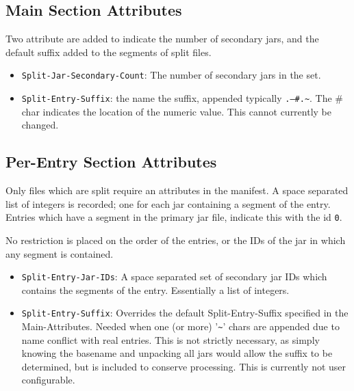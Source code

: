 \documentclass[a4paper, 12pt, pdftex]{report}
\begin{document}
\subsection{Main Section Attributes}

Two attribute are added to indicate the number of secondary jars, and
the default suffix added to the segments of split files.

\begin{itemize}
  \item \texttt{Split-Jar-Secondary-Count}: The number of secondary jars
        in the set.
  \item \texttt{Split-Entry-Suffix}: the name the suffix, appended typically
        \texttt{.---\#.\~{}}. The \# char indicates the location of the numeric value.
        This cannot currently be changed.
\end{itemize}

\subsection{Per-Entry Section Attributes}

Only files which are split require an attributes in the manifest. A
space separated list of integers is recorded; one for each jar
containing a segment of the entry. Entries which have a segment in the
primary jar file, indicate this with the id \texttt{0}.

No restriction is placed on the order of the entries, or the IDs of the
jar in which any segment is contained.

\begin{itemize}
  \item \texttt{Split-Entry-Jar-IDs}: A space separated set of
        secondary jar IDs which contains the segments of the
        entry. Essentially a list of integers.
  \item \texttt{Split-Entry-Suffix}: Overrides the default
        Split-Entry-Suffix specified in the Main-Attributes. Needed
        when one (or more) '\texttt{\~{}}' chars are appended due to name
        conflict with real entries.  This is not strictly necessary,
        as simply knowing the basename and unpacking all jars would
        allow the suffix to be determined, but is included to conserve
        processing. This is currently not user configurable.
\end{itemize}
\end{document}
